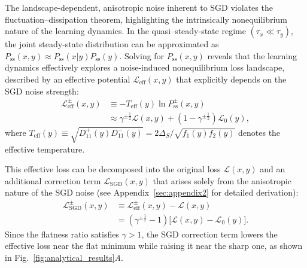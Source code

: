 \documentclass[aps,prx,reprint,superscriptaddress,longbibliography,nofootinbib,floatfix]{revtex4-2}
\begin{document}
The landscape-dependent, anisotropic noise inherent to SGD violates the fluctuation–dissipation theorem, highlighting the intrinsically nonequilibrium nature of the learning dynamics. In the quasi–steady-state regime $(\tau_x\ll \tau_y)$, the joint steady-state distribution can be approximated as $P_{\mathrm{ss}}(x,y) \approx P_{\mathrm{ss}}(x|y)P_{\mathrm{ss}}(y)$. Solving for $P_{\mathrm{ss}}(x,y)$ reveals that the learning dynamics effectively explores a noise-induced nonequilibrium loss landscape, described by an effective potential $\mathcal{L}_{\mathrm{eff}}(x,y)$ that explicitly depends on the SGD noise strength:
\begin{equation}
\begin{split}
    \mathcal{L}_{\mathrm{eff}}^{\pm}(x,y)
    &\equiv -T_{\mathrm{eff}}(y)\ln P_\mathrm{ss}^{\pm}(x,y)  \\
    &\approx 
    \gamma^{\pm\frac{1}{2}}\mathcal{L}(x,y)
    +\left(1-\gamma^{\pm\frac{1}{2}}\right)\mathcal{L}_0(y),
\end{split}
\label{eq:effective_loss_SGD}
\end{equation}
where $T_{\mathrm{eff}}(y) \equiv \sqrt{D_{11}^{+}(y)D_{11}^{-}(y)} = 2\Delta_S / \sqrt{f_1(y)f_2(y)}$ denotes the effective temperature.  

This effective loss can be decomposed into the original loss $\mathcal{L}(x,y)$ and an additional correction term $\mathcal{L}_{\mathrm{SGD}}(x,y)$ that arises solely from the anisotropic nature of the SGD noise (see Appendix~\ref{sec:appendix2} for detailed derivation):
\begin{equation}
\begin{split}
    \mathcal{L}_{\mathrm{SGD}}^{\pm}(x,y)
    &\equiv \mathcal{L}_{\mathrm{eff}}^{\pm}(x,y)-\mathcal{L}(x,y) \\
    &= \left(\gamma^{\pm\frac{1}{2}}-1\right)
    \big[\mathcal{L}(x,y)-\mathcal{L}_0(y)\big].
\end{split}
\end{equation}
Since the flatness ratio satisfies $\gamma > 1$, the SGD correction term lowers the effective loss near the flat minimum while raising it near the sharp one, as shown in Fig.~\ref{fig:analytical_results}\textit{A}. 
\end{document}
